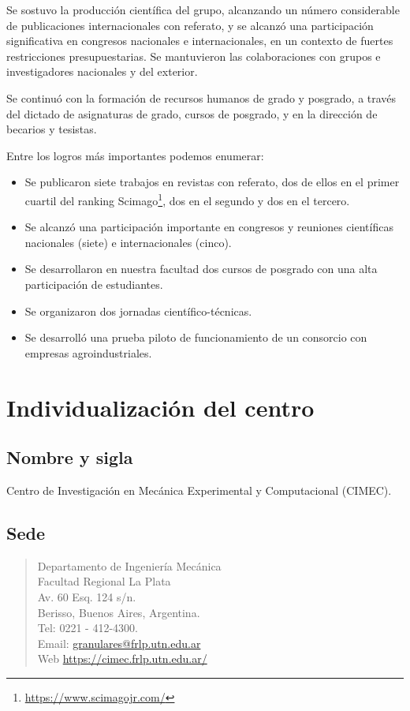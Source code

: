 \documentclass[a4paper,11pt,twoside,final,titlepage,onecolumn,openright]{report}
\begin{document}
Se sostuvo la producción científica del grupo, alcanzando un número considerable de publicaciones internacionales con referato, y se alcanzó una participación significativa en congresos nacionales e internacionales, en un contexto de fuertes restricciones presupuestarias. Se mantuvieron las colaboraciones con grupos e investigadores nacionales y del exterior.

Se continuó con la formación de recursos humanos de grado y posgrado, a través del dictado de asignaturas de grado, cursos de posgrado, y en la dirección de becarios y tesistas.

Entre los logros más importantes podemos enumerar:

\begin{itemize}
	\item Se publicaron siete trabajos en revistas con referato, dos de ellos en el primer cuartil del ranking Scimago\footnote{\url{https://www.scimagojr.com/}}, dos en el segundo y dos en el tercero.
	\item Se alcanzó una participación importante en congresos y reuniones científicas nacionales (siete) e internacionales (cinco).
	\item Se desarrollaron en nuestra facultad dos cursos de posgrado con una alta participación de estudiantes. 
	\item Se organizaron dos jornadas científico-técnicas.
  \item Se desarrolló una prueba piloto de funcionamiento de un consorcio con empresas agroindustriales.
\end{itemize}


\section{Individualización del centro}

\subsection{Nombre y sigla}
Centro de Investigación en Mecánica Experimental y Computacional (CIMEC).

\subsection{Sede}
\begin{quote}
	Departamento de Ingeniería Mecánica \\
	Facultad Regional La Plata\\
	Av. 60 Esq. 124 s/n.\\
	Berisso, Buenos Aires, Argentina. \\
	Tel: 0221 - 412-4300. \\
	Email: \href{mailto://granulares@frlp.utn.edu.ar}{granulares@frlp.utn.edu.ar} \\
	Web \href{https://cimec.frlp.utn.edu.ar/}{https://cimec.frlp.utn.edu.ar/}
\end{quote}
\end{document}

